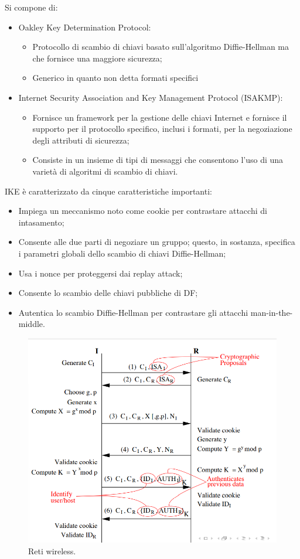 Si compone di:
\begin{itemize}
    \item  Oakley Key Determination Protocol:
	\begin{itemize}
	    \item Protocollo di scambio di chiavi basato sull'algoritmo Diffie-Hellman ma che fornisce una maggiore sicurezza;
		\item Generico in quanto non detta formati specifici
	\end{itemize}
	\item Internet Security Association and Key Management Protocol (ISAKMP):
	\begin{itemize}
	    \item Fornisce un framework per la gestione delle chiavi Internet e fornisce il supporto per il  protocollo specifico, inclusi i formati, per la negoziazione degli attributi di sicurezza;
		\item Consiste in un insieme di tipi di messaggi che consentono l'uso di una varietà di algoritmi di scambio di chiavi.
	\end{itemize}
\end{itemize}

IKE è caratterizzato da cinque caratteristiche importanti:
\begin{itemize}
    \item Impiega un meccanismo noto come cookie per contrastare attacchi di intasamento;
	\item Consente alle due parti di negoziare un gruppo; questo, in sostanza, specifica i parametri globali dello scambio di chiavi Diffie-Hellman;
	\item Usa i nonce per proteggersi dai replay attack;
	\item Consente lo scambio delle chiavi pubbliche di DF;
	\item Autentica lo scambio Diffie-Hellman per contrastare gli attacchi man-in-the-middle.
\end{itemize}

\begin{figure}[h]
    \centering
    \includegraphics[width=1\textwidth]{images/chapter9/9-14.png}
    \caption{Reti wireless.}
    \label{fig:9-14}
\end{figure}

